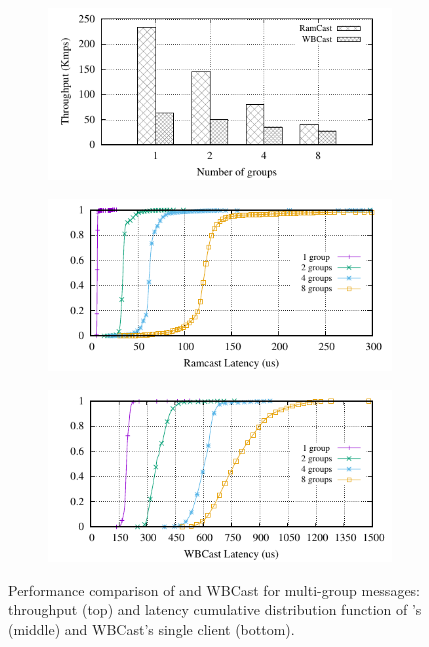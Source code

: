 \begin{figure}[htp!]
  \begin{subfigure}{\columnwidth}
    \advance\leftskip-0.1cm
    \includegraphics[width=0.99\columnwidth]{figures/benchmark/graphs/figure-multi-dest-compare-throughput}
  \end{subfigure}
  \begin{subfigure}{\columnwidth}
    \centering
    \includegraphics[width=0.95\columnwidth]{figures/benchmark/graphs/figure-multi-dest-compare-latency-cdf-ramcast}
  \end{subfigure}
  \begin{subfigure}{\columnwidth}
    \centering
    \includegraphics[width=0.95\columnwidth]{figures/benchmark/graphs/figure-multi-dest-compare-latency-cdf-WBCast}
  \end{subfigure}
  \caption{Performance comparison of \libname and WBCast for multi-group messages: throughput (top) and latency cumulative distribution function of \libname's (middle) and WBCast's single client (bottom).}
  \label{fig:multicast-multi-group}
\end{figure}
